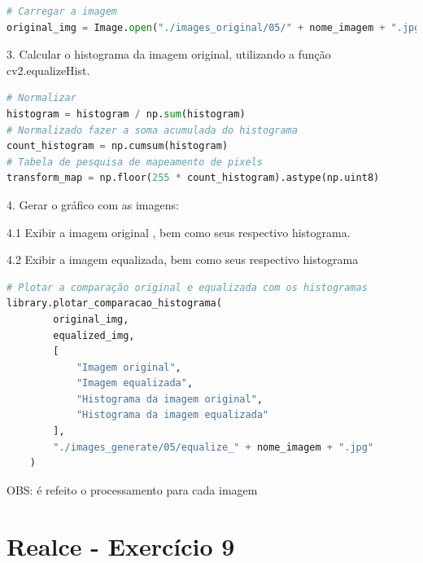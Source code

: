 \documentclass[10pt,a4paper]{article}
\begin{document}
\begin{lstlisting}[language=Python]       
# Carregar a imagem
original_img = Image.open("./images_original/05/" + nome_imagem + ".jpg")
\end{lstlisting}

\begin{flushleft}
3. Calcular o histograma da imagem original, utilizando a função cv2.equalizeHist.
\end{flushleft}

\begin{lstlisting}[language=Python]    
# Normalizar
histogram = histogram / np.sum(histogram)
# Normalizado fazer a soma acumulada do histograma
count_histogram = np.cumsum(histogram)
# Tabela de pesquisa de mapeamento de pixels
transform_map = np.floor(255 * count_histogram).astype(np.uint8)
\end{lstlisting}

\begin{flushleft}
4. Gerar o gráfico com as imagens:
\end{flushleft}

\begin{flushleft}
4.1 Exibir a imagem original , bem como seus respectivo histograma.
\end{flushleft}

\begin{flushleft}
4.2 Exibir a  imagem equalizada, bem como seus respectivo histograma
\end{flushleft}

\begin{lstlisting}[language=Python]
# Plotar a comparação original e equalizada com os histogramas
library.plotar_comparacao_histograma(
        original_img, 
        equalized_img,
        [
            "Imagem original",
            "Imagem equalizada",
            "Histograma da imagem original",
            "Histograma da imagem equalizada"
        ],
        "./images_generate/05/equalize_" + nome_imagem + ".jpg"
    )
\end{lstlisting}

\begin{flushleft}
OBS: é refeito o processamento para cada imagem
\end{flushleft}

\pagebreak

\section{Realce - Exercício 9}
\end{document}
